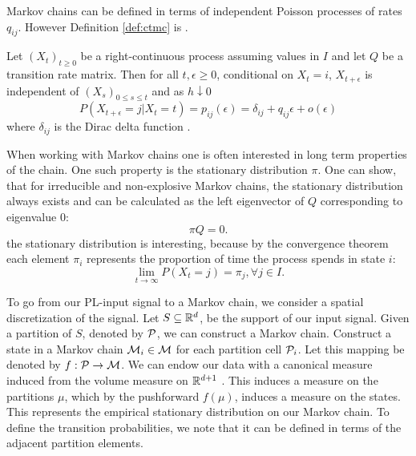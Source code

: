 Markov chains can be defined in terms of  independent Poisson processes
of rates $q_{ij}$. However Definition \ref{def:ctmc} is .

\begin{defn}
	\label{def:ctmc}
	Let $(X_t)_{t \ge 0}$ be a right-continuous process assuming values in $I$ and let $Q$
	be a transition rate matrix. Then for all $t, \epsilon \ge 0$, conditional on $X_t = i$,
	$X_{t+\epsilon}$ is independent of $(X_s)_{0 \le s \le t}$ and as $h \downarrow 0$
	\begin{equation}
		\nonumber
		P(X_{t+\epsilon} = j | X_t = t) = p_{ij}(\epsilon) = \delta_{ij} + q_{ij}\epsilon + o(\epsilon)
	\end{equation}
	where $\delta_{ij}$ is the Dirac delta function \cite{norris1998markov}.
\end{defn}
When working with Markov
chains one is often interested in long term properties of the chain. One such property is the
stationary distribution $\pi$. One can show, that for irreducible and non-explosive Markov chains,
the stationary distribution always exists and can be calculated as the left eigenvector of $Q$ 
corresponding to eigenvalue $0$:
\begin{equation}
	\nonumber
	\pi Q = 0.
\end{equation}
 the stationary distribution is interesting, because by the convergence theorem
\cite{aldous-fill-2014}
each element $\pi_i$ represents the proportion of time the process spends in state $i$:
\begin{equation}
	\nonumber
	\lim\limits_{t \rightarrow \infty} P(X_t = j) = \pi_j, \forall j \in I.
\end{equation}

To go from our PL-input signal to a Markov chain, we consider a spatial discretization of the signal.
Let $S\subseteq \mathbb{R}^d$, be the support of our input signal. Given a partition of $S$, denoted by  $\mathcal{P}$, 
we can construct a Markov chain. Construct a  state in a Markov chain $\mathcal{M}_i \in \mathcal{M}$ for each  partition cell $\mathcal{P}_i$. Let this mapping be denoted by $f:\mathcal{P} \rightarrow \mathcal{M}$. We can endow our data with a canonical measure induced from the volume measure on $\mathbb{R}^{d+1}$ . This induces a measure on the partitions $\mu$, which by the  pushforward $f(\mu)$, induces a measure on the states. This represents the empirical stationary distribution on our Markov chain. To define the transition probabilities, we note that it can be defined in terms of the adjacent partition elements.  

